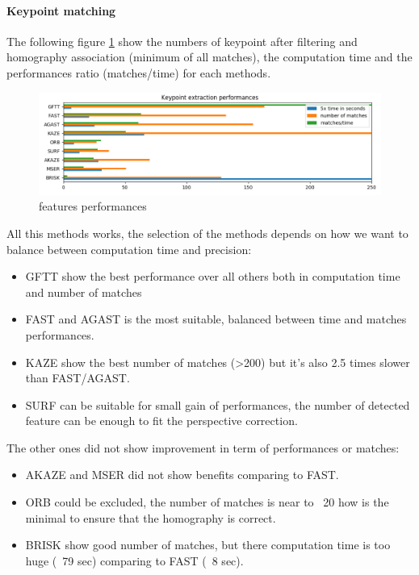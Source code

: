 \documentclass[]{elsarticle}
\begin{document}
			\paragraph{Keypoint matching} 
			The following figure \ref{fig:features-performances} show the numbers of keypoint after filtering and homography association (minimum of all matches),
			the computation time and the performances ratio (matches/time) for each methods.
			
			\begin{figure}[!htb]
				\centering
				\includegraphics[width=\linewidth]{../figures/comparaison-keypoint-performances.png}
				\caption{features performances}
				\label{fig:features-performances}
			\end{figure}
		
			\noindent
			All this methods works, the selection of the methods depends on how we want to balance between computation time and precision:
			\begin{itemize}
				\item GFTT show the best performance over all others both in computation time and number of matches
				\item FAST and AGAST is the most suitable, balanced between time and matches performances.
				\item KAZE show the best number of matches (>200) but it's also 2.5 times slower than FAST/AGAST.
				\item SURF can be suitable for small gain of performances, the number of detected feature can be enough to fit the perspective correction.
			\end{itemize}
			
			\noindent
			The other ones did not show improvement in term of performances or matches:
			\begin{itemize}
				\item AKAZE and MSER did not show benefits comparing to FAST.
				\item ORB could be excluded, the number of matches is near to ~20 how is the minimal to ensure that the homography is correct.
				\item BRISK show good number of matches, but there computation time is too huge (~79 sec) comparing to FAST (~8 sec).
			\end{itemize}
		
\end{document}
